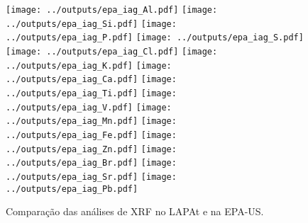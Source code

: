 \newpage
\begin{figure}[H]
  \centering
    \texttt{[image: ../outputs/epa\_iag\_Al.pdf]}
    \texttt{[image: ../outputs/epa\_iag\_Si.pdf]}
    \texttt{[image: ../outputs/epa\_iag\_P.pdf]}
    \texttt{[image: ../outputs/epa\_iag\_S.pdf]}
    \texttt{[image: ../outputs/epa\_iag\_Cl.pdf]}
    \texttt{[image: ../outputs/epa\_iag\_K.pdf]}
    \texttt{[image: ../outputs/epa\_iag\_Ca.pdf]}
    \texttt{[image: ../outputs/epa\_iag\_Ti.pdf]}
    \texttt{[image: ../outputs/epa\_iag\_V.pdf]}
    \texttt{[image: ../outputs/epa\_iag\_Mn.pdf]}
    \texttt{[image: ../outputs/epa\_iag\_Fe.pdf]}
    \texttt{[image: ../outputs/epa\_iag\_Zn.pdf]}
    \texttt{[image: ../outputs/epa\_iag\_Br.pdf]}
    \texttt{[image: ../outputs/epa\_iag\_Sr.pdf]}
    \texttt{[image: ../outputs/epa\_iag\_Pb.pdf]}
  \caption{Comparação das análises de XRF no LAPAt e na EPA-US. 
           \label{fig:epa_lapat}}
\end{figure}
